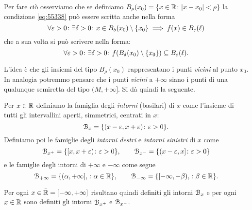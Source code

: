 Per fare ciò osserviamo che
se definiamo%
$B_\rho(x_0) = {\left\{ x\in {\mathbb R} \colon {\left|x-x_0\right|}<\rho \right\}}$
la condizione \eqref{eq:55338}
può essere scritta anche nella forma 
\[
  \forall \varepsilon>0\colon \exists \delta >0 \colon 
  x \in B_\delta(x_0)\setminus{\left\{ x_0 \right\}} \implies f(x) \in B_\varepsilon(\ell)  
\]
che a sua volta si può scrivere nella forma:
\[
  \forall \varepsilon>0\colon \exists \delta >0 \colon 
  f(B_\delta(x_0)\setminus{\left\{ x_0 \right\}}) \subseteq  B_\varepsilon(\ell).    
\]

L'idea è che gli insiemi del tipo
$B_\rho(x_0)$ 
rappresentano i punti \emph{vicini} al punto $x_0$. 
In analogia potremmo pensare che i punti \emph{vicini} 
a $+\infty$ siano i punti di una qualunque semiretta 
del tipo $(M,+\infty]$.
Si dà quindi la seguente.


\begin{definition}[intorno]
Per $x\in {\mathbb R}$ definiamo la famiglia degli \emph{intorni}%
%
 (basilari) di $x$
come l'insieme di tutti gli intervallini aperti, simmetrici, centrati in $x$:
\[
  \mathcal B_x = {\left\{  (x-\varepsilon, x+\varepsilon) \colon \varepsilon>0 \right\}}.
\]
Definiamo poi le famiglie 
degli \emph{intorni destri} e \emph{intorni sinistri}
%
di $x$ come
\[
  \mathcal B_{x^+} = {\left\{  [x, x+\varepsilon) \colon \varepsilon>0 \right\}},
  \qquad
  \mathcal B_{x^-} = {\left\{  (x-\varepsilon , x] \colon \varepsilon>0 \right\}}
\]
e le famiglie degli intorni di $+\infty$ e $-\infty$ come segue
\[
  \mathcal B_{+\infty} = {\left\{  (\alpha,+\infty], \colon \alpha \in {\mathbb R}  \right\}},\qquad
  \mathcal B_{-\infty} = {\left\{  [-\infty, -\beta), \colon \beta\in {\mathbb R} \right\}}.
\]

Per ogni $x\in \bar {{\mathbb R}} = [-\infty, +\infty]$
risultano quindi definiti gli intorni $\mathcal B_x$ e per
ogni $x\in {\mathbb R}$ sono definiti gli intorni $\mathcal B_{x^+}$ e $\mathcal B_{x^-}$.
\end{definition}

